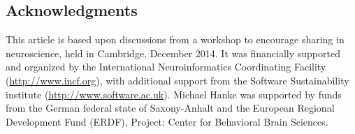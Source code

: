 \documentclass[11pt]{article}
\begin{document}
\subsection*{Acknowledgments}

This article is based upon discussions from a workshop to encourage
sharing in neuroscience, held in Cambridge, December 2014.  It was
financially supported and organized by the International
Neuroinformatics Coordinating Facility (\url{http://www.incf.org}),
with additional support from the Software Sustainability institute
(\url{http://www.software.ac.uk}).
%
Michael Hanke was supported by funds from the German federal state of
Saxony-Anhalt and the European Regional Development Fund (ERDF), Project:
Center for Behavioral Brain Sciences.


\printbibliography
\end{document}
